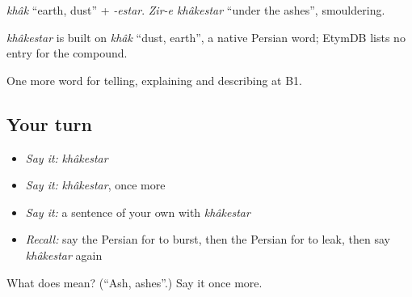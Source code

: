 \emph{khâk} \textquotedblleft{}earth, dust\textquotedblright{} + \emph{-estar}. \emph{Zir-e khâkestar} \textquotedblleft{}under the ashes\textquotedblright{}, smouldering.

\begin{cousinweb}
\emph{khâkestar} is built on \emph{khâk} \textquotedblleft{}dust, earth\textquotedblright{}, a native Persian word; EtymDB lists no entry for the compound.
\end{cousinweb}

\begin{grammarlens}[title={What you've built}]
One more word for telling, explaining and describing at B1.
\end{grammarlens}

\subsection*{Your turn}
\begin{itemize}
\raggedright
  \item \emph{Say it:} \emph{khâkestar}
  \item \emph{Say it:} \emph{khâkestar}, once more
  \item \emph{Say it:} a sentence of your own with \emph{khâkestar}
  \item \emph{Recall:} say the Persian for to burst, then the Persian for to leak, then say \emph{khâkestar} again
\end{itemize}

\begin{tcolorbox}[breakable,colback=teal!4,colframe=teal!35!black,title={Before you move on}]
What does  mean? (\textquotedblleft{}Ash, ashes\textquotedblright{}.) Say it once more.
\end{tcolorbox}
